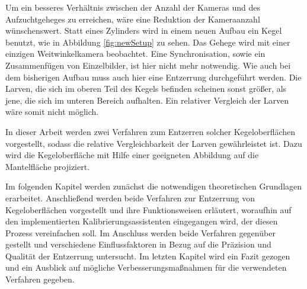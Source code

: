 Um ein besseres Verhältnis zwischen der Anzahl der Kameras und des Aufzuchtgeheges zu erreichen, wäre eine Reduktion der Kameraanzahl wünschenswert.
Statt eines Zylinders wird in einem neuen Aufbau ein Kegel benutzt, wie in Abbildung \ref{fig:newSetup} zu sehen. Das Gehege wird mit einer einzigen Weitwinkelkamera beobachtet. Eine Synchronisation, sowie ein Zusammenfügen von Einzelbilder, ist hier nicht mehr notwendig.
Wie auch bei dem bisherigen Aufbau muss auch hier eine Entzerrung durchgeführt werden. Die Larven, die sich im oberen Teil des Kegels befinden scheinen sonst größer, als jene, die sich im unteren Bereich aufhalten. Ein relativer Vergleich der Larven wäre somit nicht möglich.

In dieser Arbeit werden zwei Verfahren zum Entzerren solcher Kegeloberflächen vorgestellt, sodass die relative Vergleichbarkeit der Larven gewährleistet ist.
Dazu wird die Kegeloberfläche mit Hilfe einer geeigneten Abbildung auf die Mantelfläche projiziert.

Im folgenden Kapitel werden zunächst die notwendigen theoretischen Grundlagen erarbeitet.
Anschließend werden beide Verfahren zur Entzerrung von Kegeloberflächen vorgestellt und ihre Funktionsweisen erläutert, woraufhin auf den implementierten Kalibrierungsassistenten eingegangen wird, der diesen Prozess vereinfachen soll.
Im Anschluss werden beide Verfahren gegenüber gestellt und verschiedene Einflussfaktoren in Bezug auf die Präzision und Qualität der Entzerrung untersucht.
Im letzten Kapitel wird ein Fazit gezogen und ein Ausblick auf mögliche Verbesserungsmaßnahmen für die verwendeten Verfahren gegeben.
